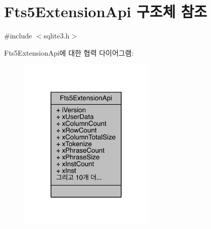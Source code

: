 \hypertarget{struct_fts5_extension_api}{}\section{Fts5\+Extension\+Api 구조체 참조}
\label{struct_fts5_extension_api}


{\ttfamily \#include $<$sqlite3.\+h$>$}



Fts5\+Extension\+Api에 대한 협력 다이어그램\+:
\nopagebreak
\begin{figure}[H]
\begin{center}
\leavevmode
\includegraphics[width=184pt]{d4/d38/struct_fts5_extension_api__coll__graph}
\end{center}
\end{figure}
